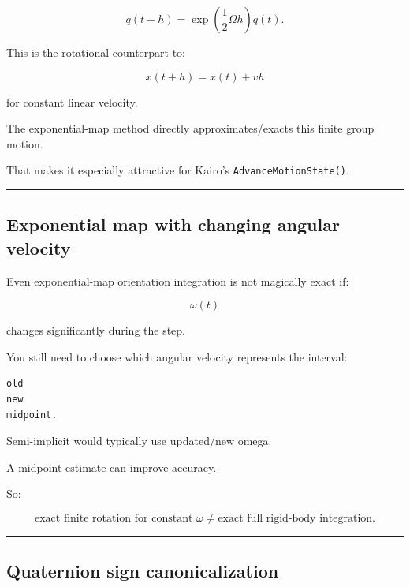 \[
q(t+h)
=
\exp\left(
\frac12\Omega h
\right)
q(t).
\]

This is the rotational counterpart to:

\[
x(t+h)
=
x(t)+vh
\]

for constant linear velocity.

The exponential-map method directly approximates/exacts this finite group motion.

That makes it especially attractive for Kairo's \texttt{AdvanceMotionState()}.

\begin{center}\rule{0.5\linewidth}{0.5pt}\end{center}

\subsection{Exponential map with changing angular velocity}\label{06-engine-ii-ch038-exponential-map-with-changing-angular-velocity}

\hypertarget{06-engine-ii-ch038-exponential-map-with-changing-angular-velocity}{}

Even exponential-map orientation integration is not magically exact if:

\[
\omega(t)
\]

changes significantly during the step.

You still need to choose which angular velocity represents the interval:

\begin{verbatim}
old
new
midpoint.
\end{verbatim}

Semi-implicit would typically use updated/new omega.

A midpoint estimate can improve accuracy.

So:

\[
\boxed{
\text{exact finite rotation for constant }\omega
\neq
\text{exact full rigid-body integration}.
}
\]

\begin{center}\rule{0.5\linewidth}{0.5pt}\end{center}

\subsection{Quaternion sign canonicalization}\label{06-engine-ii-ch038-quaternion-sign-canonicalization}

\hypertarget{06-engine-ii-ch038-quaternion-sign-canonicalization}{}

